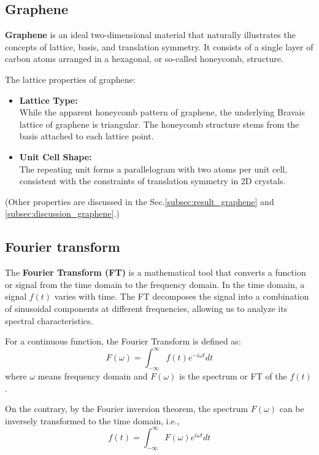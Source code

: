 \documentclass[12pt,a4paper]{article}
\begin{document}
\begin{CJK}{UTF8}{bkai}
\subsection{Graphene}
\hfill

\textbf{Graphene} is an ideal two-dimensional material that naturally illustrates the concepts of lattice, basis, and translation symmetry. It consists of a single layer of carbon atoms arranged in a hexagonal, or so-called honeycomb, structure.


The lattice properties of graphene:
\begin{itemize}
    \item \textbf{Lattice Type:}\\
    While the apparent honeycomb pattern of graphene, the underlying Bravais lattice of graphene is triangular. The honeycomb structure stems from the basis attached to each lattice point.
    \item \textbf{Unit Cell Shape:}\\
    The repeating unit forms a parallelogram with two atoms per unit cell, consistent with the constraints of translation symmetry in 2D crystals.
\end{itemize}
(Other properties are discussed in the Sec.\ref{subsec:result_graphene} and \ref{subsec:discussion_graphene}.)


\subsection{Fourier transform}
\hfill

The \textbf{Fourier Transform (FT)} is a mathematical tool that converts a function or signal from the time domain to the frequency domain. In the time domain, a signal $f(t)$ varies with time. The FT decomposes the signal into a combination of sinusoidal components at different frequencies, allowing us to analyze its spectral characteristics.

For a continuous function, the Fourier Transform is defined as:
\begin{equation}
    F(\omega) = \int^{\infty}_{-\infty} f(t) e^{-i\omega t}dt
\end{equation}
where $\omega$ means frequency domain and $F(\omega)$ is the spectrum or FT of the $f(t)$.

On the contrary, by the Fourier inversion theorem, the spectrum $F(\omega)$ can be inversely transformed to the time domain, i.e., 
\begin{equation}
   f(t)  = \int^{\infty}_{-\infty} F(\omega) e^{i\omega t}dt
\end{equation}


\end{CJK}
\end{document}
